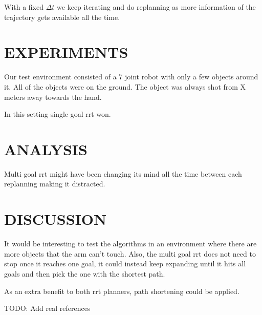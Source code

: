 \documentclass[letterpaper, 10 pt, conference]{ieeeconf}  %
\begin{document}
With a fixed $\Delta t$ we keep iterating and do replanning as more information
of the trajectory gets available all the time.

\section{EXPERIMENTS}

Our test environment consisted of a 7 joint robot with only a few
objects around it. All of the objects were on the ground. The object was
always shot from X meters away towards the hand.

In this setting single goal rrt won.

\section{ANALYSIS}

Multi goal rrt might have been changing its mind all the time between each replanning making it distracted.

\section{DISCUSSION}

It would be interesting to test the algorithms in an environment where there
are more objects that the arm can't touch. Also, the multi goal rrt does not
need to stop once it reaches one goal, it could instead keep expanding until it
hits all goals and then pick the one with the shortest path.

As an extra benefit to both rrt planners, path shortening could be applied.

\begin{thebibliography}{99}

 TODO: Add real references

\end{thebibliography}
\end{document}
